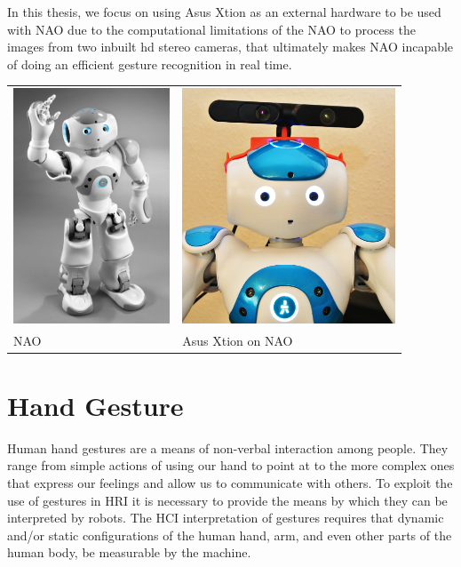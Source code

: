 In this thesis, we focus on using Asus Xtion as an external hardware to be used with NAO due to the computational limitations of the NAO to process the images from two inbuilt hd stereo cameras, that ultimately makes NAO incapable of doing an efficient gesture recognition in real time.

\begin{table}
	[h] \centering 
	\begin{tabular}
		{ll} 
		\includegraphics[height=7cm]{figures/nao.png} & 
		\includegraphics[height=7cm]{figures/nao-xtion.png} \\
		NAO & Asus Xtion on NAO 
	\end{tabular}
\end{table}

\section{Hand Gesture} Human hand gestures are a means of non-verbal interaction among people. They range from simple actions of using our hand to point at to the more complex ones that express our feelings and allow us to communicate with others. To exploit the use of gestures in HRI it is necessary to provide the means by which they can be interpreted by robots. The HCI interpretation of gestures requires that dynamic and/or static configurations of the human hand, arm, and even other parts of the human body, be measurable by the machine. 

